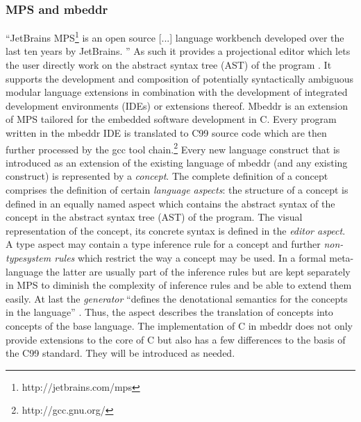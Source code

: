 \subsubsection{MPS and mbeddr}
``JetBrains MPS\footnote{http://jetbrains.com/mps} is an open source [...] language workbench developed over the last ten years by JetBrains. '' \cite{GenericTools_SpecificLanguages} As such it provides a projectional editor which lets the user directly work on the abstract syntax tree (AST) of the program \cite{LanguageWorkbenches}. It supports the development and composition of potentially syntactically ambiguous modular language extensions in combination with the development of integrated development environments (IDEs) or extensions thereof. Mbeddr is an extension of MPS tailored for the embedded software development in C. Every program written in the mbeddr IDE is translated to C99 source code which are then further processed by the gcc tool chain.\footnote{http://gcc.gnu.org/} Every new language construct that is introduced as an extension of the existing language of mbeddr (and any existing construct) is represented by a \textit{concept}. The complete definition of a concept comprises the definition of certain \textit{language aspects}: the structure of a concept is defined in an equally named aspect which contains the abstract syntax of the concept in the abstract syntax tree (AST) of the program. The visual representation of the concept, its concrete syntax is defined in the \textit{editor aspect}. A type aspect may contain a type inference rule for a concept and further \textit{non-typesystem rules} which restrict the way a concept may be used. In a formal meta-language the latter are usually part of the inference rules but are kept separately in MPS to diminish the complexity of inference rules and be able to extend them easily. At last the \textit{generator} ``defines the denotational semantics for the concepts in the language'' \cite{GeneratorUserGuide}. Thus, the aspect describes the translation of concepts into concepts of the base language.
The implementation of C in mbeddr does not only provide extensions to the core of C but also has a few differences to the basis of the C99 standard. They will be introduced as needed.

